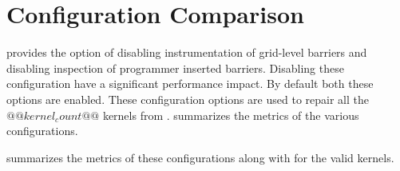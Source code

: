 \section{Configuration Comparison}

\tool provides the option of disabling instrumentation of grid-level barriers and disabling inspection of programmer inserted barriers. Disabling these configuration have a significant performance impact. By default both these options are enabled. These configuration options are used to repair all the $@@kernel_count@@$ kernels from .  summarizes the metrics of the various configurations.



 summarizes the metrics of these configurations along with \autosync for the valid kernels.


